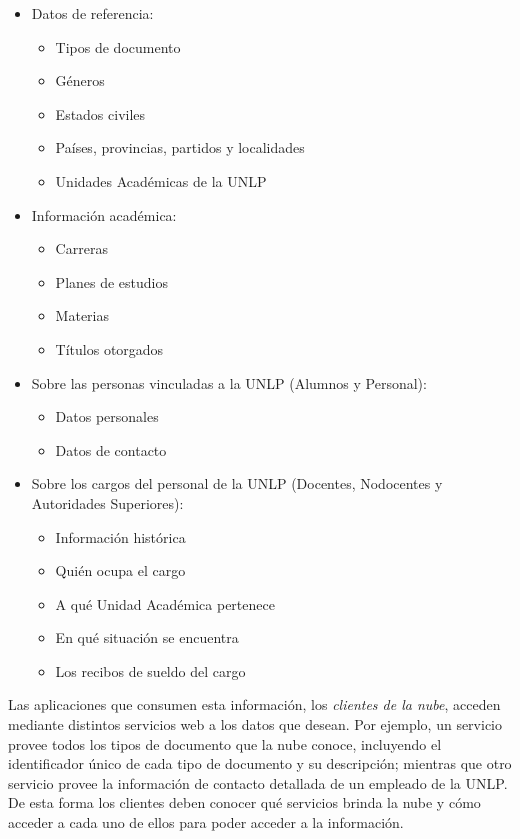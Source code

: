 \begin{itemize}
  \item Datos de referencia:
  \begin{itemize}
    \item Tipos de documento
    \item Géneros
    \item Estados civiles
    \item Países, provincias, partidos y localidades
    \item Unidades Académicas de la UNLP
  \end{itemize}
  \item Información académica:
  \begin{itemize}
    \item Carreras
    \item Planes de estudios
    \item Materias
    \item Títulos otorgados
  \end{itemize}
  \item Sobre las personas vinculadas a la UNLP (Alumnos y Personal):
  \begin{itemize}
    \item Datos personales
    \item Datos de contacto
  \end{itemize}
  \item Sobre los cargos del personal de la UNLP (Docentes, Nodocentes y Autoridades Superiores):
  \begin{itemize}
    \item Información histórica
    \item Quién ocupa el cargo
    \item A qué Unidad Académica pertenece
    \item En qué situación se encuentra
    \item Los recibos de sueldo del cargo
  \end{itemize}
\end{itemize}

Las aplicaciones que consumen esta información, los \textit{clientes de la nube}, acceden mediante distintos servicios web a los datos que desean. Por ejemplo, un servicio provee todos los tipos de documento que la nube conoce, incluyendo el identificador único de cada tipo de documento y su descripción; mientras que otro servicio provee la información de contacto detallada de un empleado de la UNLP. De esta forma los clientes deben conocer qué servicios brinda la nube y cómo acceder a cada uno de ellos para poder acceder a la información.

